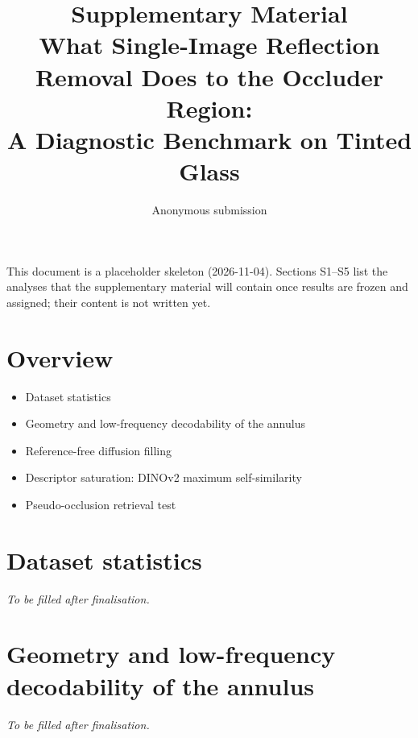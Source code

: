 \documentclass[10pt]{article}
\title{Supplementary Material\\[4pt]
\large What Single-Image Reflection Removal Does to the Occluder Region:\\
A Diagnostic Benchmark on Tinted Glass}
\author{Anonymous submission}
\date{}
\begin{document}
\maketitle

\noindent This document is a placeholder skeleton (2026-11-04). Sections S1--S5 list the
analyses that the supplementary material will contain once results are frozen and assigned;
their content is not written yet.

\section{Overview}
\begin{itemize}
  \item[S1] Dataset statistics
  \item[S2] Geometry and low-frequency decodability of the annulus
  \item[S3] Reference-free diffusion filling
  \item[S4] Descriptor saturation: DINOv2 maximum self-similarity
  \item[S5] Pseudo-occlusion retrieval test
\end{itemize}

\section{Dataset statistics}
\label{supp:data}
\emph{To be filled after finalisation.}

\section{Geometry and low-frequency decodability of the annulus}
\label{supp:ring}
\emph{To be filled after finalisation.}
\end{document}

